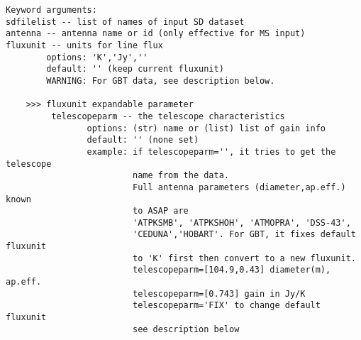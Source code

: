 \begin{verbatim}
Keyword arguments:
sdfilelist -- list of names of input SD dataset
antenna -- antenna name or id (only effective for MS input)
fluxunit -- units for line flux
        options: 'K','Jy',''
        default: '' (keep current fluxunit)
        WARNING: For GBT data, see description below.
        
    >>> fluxunit expandable parameter
         telescopeparm -- the telescope characteristics
                options: (str) name or (list) list of gain info
                default: '' (none set)
                example: if telescopeparm='', it tries to get the telescope
                         name from the data.
                         Full antenna parameters (diameter,ap.eff.) known
                         to ASAP are
                         'ATPKSMB', 'ATPKSHOH', 'ATMOPRA', 'DSS-43',
                         'CEDUNA','HOBART'. For GBT, it fixes default fluxunit
                         to 'K' first then convert to a new fluxunit.
                         telescopeparm=[104.9,0.43] diameter(m), ap.eff.
                         telescopeparm=[0.743] gain in Jy/K
                         telescopeparm='FIX' to change default fluxunit
                         see description below


\end{verbatim}

